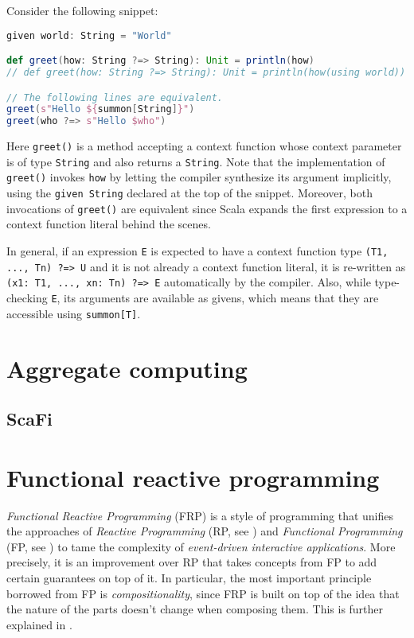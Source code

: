 Consider the following snippet:
%
\begin{lstlisting}[frame=single, language=scala]
given world: String = "World"

def greet(how: String ?=> String): Unit = println(how)
// def greet(how: String ?=> String): Unit = println(how(using world))

// The following lines are equivalent.
greet(s"Hello ${summon[String]}")
greet(who ?=> s"Hello $who")
\end{lstlisting}
%
Here \texttt{greet()} is a method accepting a context function whose context parameter is of type \texttt{String} and also returns a \texttt{String}.
%
Note that the implementation of \texttt{greet()} invokes \texttt{how} by letting the compiler synthesize its argument implicitly, using the \texttt{given String} declared at the top of the snippet.
%
Moreover, both invocations of \texttt{greet()} are equivalent since Scala expands the first expression to a context function literal behind the scenes.

In general, if an expression \texttt{E} is expected to have a context function type \texttt{(T1, ..., Tn) ?=> U} and it is not already a context function literal, it is re-written as \texttt{(x1: T1, ..., xn: Tn) ?=> E} automatically by the compiler.
%
Also, while type-checking \texttt{E}, its arguments are available as givens, which means that they are accessible using \texttt{summon[T]}.

\section{Aggregate computing}

\subsection{ScaFi}

\section{Functional reactive programming}

\textit{Functional Reactive Programming} (FRP) is a style of programming that unifies the approaches of \textit{Reactive Programming} (RP, see ) and \textit{Functional Programming} (FP, see ) to tame the complexity of \textit{event-driven interactive applications}.
%
More precisely, it is an improvement over RP that takes concepts from FP to add certain guarantees on top of it.
%
In particular, the most important principle borrowed from FP is \textit{compositionality}, since FRP is built on top of the idea that the nature of the parts doesn't change when composing them.
%
This is further explained in .

